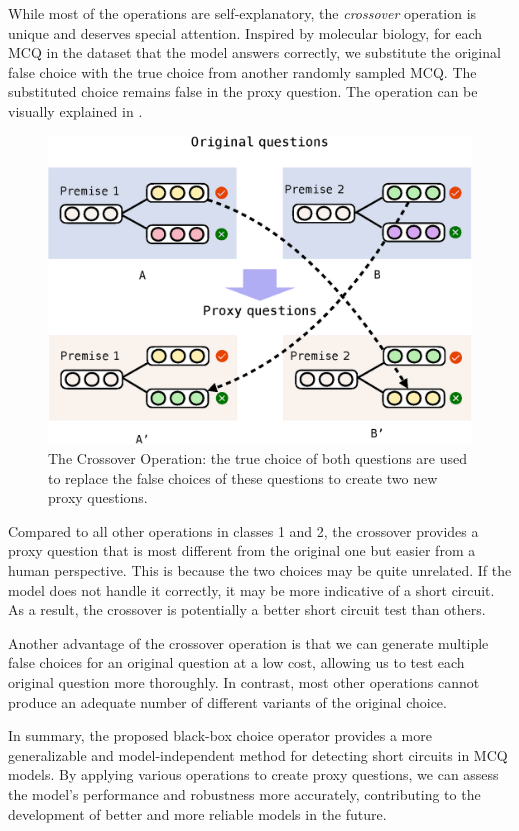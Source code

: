While most of the operations are self-explanatory, the \textit{crossover} operation is unique and deserves special attention. Inspired by molecular biology, for each MCQ in the dataset that the model answers correctly, we substitute the original false choice with the true choice from another randomly sampled MCQ. The substituted choice remains false in the proxy question. The operation can be visually explained in .

\begin{figure}[th]
\centering
\includegraphics[width=\columnwidth]{figure/cross.eps}
\caption{The Crossover Operation: the true choice of both questions
are used to replace the false choices of these questions to create
two new proxy questions.}
\label{fig:cross}
\end{figure}

Compared to all other operations in classes 1 and 2, the crossover provides a proxy question that is most different from the original one but easier from a human perspective. This is because the two choices may be quite unrelated. If the model does not handle it correctly, it may be more indicative of a short circuit. As a result, the crossover is potentially a better short circuit test than others.

Another advantage of the crossover operation is that we can generate multiple false choices for an original question at a low cost, allowing us to test each original question more thoroughly. In contrast, most other operations cannot produce an adequate number of different variants of the original choice.

In summary, the proposed black-box choice operator provides a more generalizable and model-independent method for detecting short circuits in MCQ models. By applying various operations to create proxy questions, we can assess the model's performance and robustness more accurately, contributing to the development of better and more reliable models in the future.

